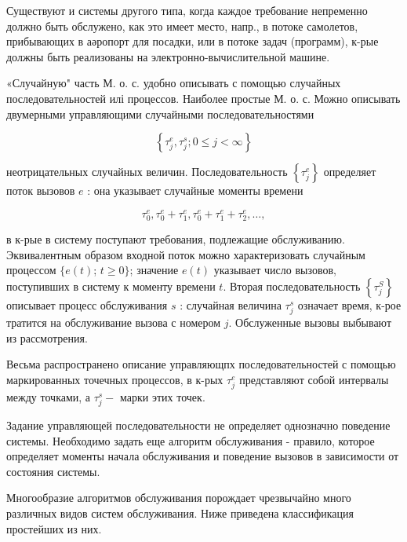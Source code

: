 \documentclass[10pt]{article}
\begin{document}
Существуют и системы другого типа, когда каждое требование непременно должно быть обслужено, как это имеет место, напр., в потоке самолетов, прибывающих в аәропорт для посадки, или в потоке задач (программ), к-рые должны быть реализованы на электронно-вычислительной машине.



«Случайную" часть М. о. с. удобно описывать с помощью случайных последовательностей илі процессов. Наиболее простые М. о. с. Можно описывать двумерными управляющими случайными последовательностями



\[

\left\{\tau_{j}^{e}, \tau_{j}^{s} ; 0 \leqslant j<\infty\right\}

\]



неотрицательных случайных величин. Последовательность $\left\{\tau_{j}^{e}\right\}$ определяет поток вызовов $e$ : она указывает случайные моменты времени



\[

\tau_{0}^{e}, \tau_{0}^{e}+\tau_{1}^{e}, \tau_{0}^{e}+\tau_{1}^{e}+\tau_{2}^{e}, \ldots,

\]



в к-рые в систему поступают требования, подлежащие обслуживанию. Эквивалентным образом входной поток можно характеризовать случайным процессом $\{e(t)$; $t \geqslant 0\}$; значение $e(t)$ указывает число вызовов, поступивших в систему к моменту времени $t$. Вторая последовательность $\left\{\tau_{j}^{S}\right\}$ описывает процесс обслуживания $s$ : случайная величина $\tau_{j}^{s}$ означает время, к-рое тратится на обслуживание вызова с номером $j$. Обслуженные вызовы выбывают из рассмотрения.



Весьма распространено описание управляющпх последовательностей с помощью маркированных точечных процессов, в к-рых $\tau_{j}^{e}$ представляют собой интервалы между точками, а $\tau_{j}^{s}-$ марки этих точек.



Задание управляющей последовательности не определяет однозначно поведение системы. Необходимо задать еще алгоритм обслуживания - правило, которое определяет моменты начала обслуживания и поведение вызовов в зависимости от состояния системы.



Многообразие алгоритмов обслуживания порождает чрезвычайно много различных видов систем обслуживания. Ниже приведена классификация простейших из них.
\end{document}

